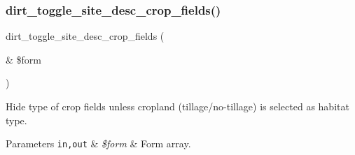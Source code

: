 \subsubsection{\texorpdfstring{dirt\+\_\+toggle\+\_\+site\+\_\+desc\+\_\+crop\+\_\+fields()}{dirt\_toggle\_site\_desc\_crop\_fields()}}
{\footnotesize\ttfamily dirt\+\_\+toggle\+\_\+site\+\_\+desc\+\_\+crop\+\_\+fields (\begin{DoxyParamCaption}\item[{\&}]{\$form }\end{DoxyParamCaption})}

Hide type of crop fields unless cropland (tillage/no-\/tillage) is selected as habitat type.


\begin{DoxyParams}[1]{Parameters}
\mbox{\tt in,out}  & {\em \$form} & Form array. \\
\hline
\end{DoxyParams}
